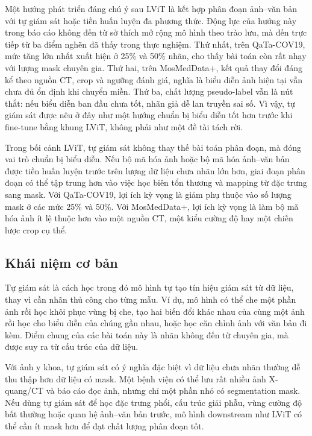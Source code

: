 Một hướng phát triển đáng chú ý sau LViT là kết hợp phân đoạn ảnh--văn bản với tự giám sát hoặc tiền huấn luyện đa phương thức. Động lực của hướng này trong báo cáo không đến từ sở thích mở rộng mô hình theo trào lưu, mà đến trực tiếp từ ba điểm nghẽn đã thấy trong thực nghiệm. Thứ nhất, trên QaTa-COV19, mức tăng lớn nhất xuất hiện ở 25\% và 50\% nhãn, cho thấy bài toán còn rất nhạy với lượng mask chuyên gia. Thứ hai, trên MosMedData+, kết quả thay đổi đáng kể theo nguồn CT, crop và ngưỡng đánh giá, nghĩa là biểu diễn ảnh hiện tại vẫn chưa đủ ổn định khi chuyển miền. Thứ ba, chất lượng pseudo-label vẫn là nút thắt: nếu biểu diễn ban đầu chưa tốt, nhãn giả dễ lan truyền sai số. Vì vậy, tự giám sát được nêu ở đây như một hướng chuẩn bị biểu diễn tốt hơn trước khi fine-tune bằng khung LViT, không phải như một đề tài tách rời.

Trong bối cảnh LViT, tự giám sát không thay thế bài toán phân đoạn, mà đóng vai trò chuẩn bị biểu diễn. Nếu bộ mã hóa ảnh hoặc bộ mã hóa ảnh--văn bản được tiền huấn luyện trước trên lượng dữ liệu chưa nhãn lớn hơn, giai đoạn phân đoạn có thể tập trung hơn vào việc học biên tổn thương và mapping từ đặc trưng sang mask. Với QaTa-COV19, lợi ích kỳ vọng là giảm phụ thuộc vào số lượng mask ở các mức 25\% và 50\%. Với MosMedData+, lợi ích kỳ vọng là làm bộ mã hóa ảnh ít lệ thuộc hơn vào một nguồn CT, một kiểu cường độ hay một chiến lược crop cụ thể.

\subsection{Khái niệm cơ bản}

Tự giám sát là cách học trong đó mô hình tự tạo tín hiệu giám sát từ dữ liệu, thay vì cần nhãn thủ công cho từng mẫu. Ví dụ, mô hình có thể che một phần ảnh rồi học khôi phục vùng bị che, tạo hai biến đổi khác nhau của cùng một ảnh rồi học cho biểu diễn của chúng gần nhau, hoặc học căn chỉnh ảnh với văn bản đi kèm. Điểm chung của các bài toán này là nhãn không đến từ chuyên gia, mà được suy ra từ cấu trúc của dữ liệu.

Với ảnh y khoa, tự giám sát có ý nghĩa đặc biệt vì dữ liệu chưa nhãn thường dễ thu thập hơn dữ liệu có mask. Một bệnh viện có thể lưu rất nhiều ảnh X-quang/CT và báo cáo đọc ảnh, nhưng chỉ một phần nhỏ có segmentation mask. Nếu dùng tự giám sát để học đặc trưng phổi, cấu trúc giải phẫu, vùng cường độ bất thường hoặc quan hệ ảnh--văn bản trước, mô hình downstream như LViT có thể cần ít mask hơn để đạt chất lượng phân đoạn tốt.

